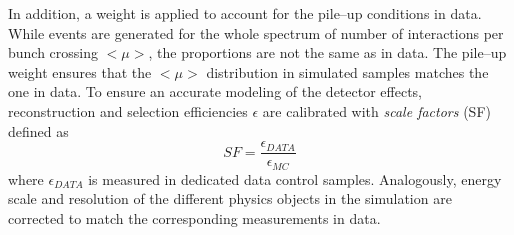 In addition, a weight is applied  to account for the pile--up
conditions in data. While events are generated for the whole spectrum
of number of interactions per bunch crossing $<\mu>$, the proportions
are not the same as in data. The pile--up weight ensures that the
$<\mu>$ distribution in simulated samples matches the one in data.
To ensure an accurate modeling of the detector effects, reconstruction
and selection efficiencies $\epsilon$ are calibrated with {\it scale factors}
(SF) defined as 
\begin{equation}
SF = \frac{\epsilon_{DATA}}{\epsilon_{MC}}
\end{equation}
where $\epsilon_{DATA}$ is measured in dedicated data control samples.
Analogously, energy scale and resolution of the different physics
objects in the simulation are corrected to match the corresponding
measurements in data.